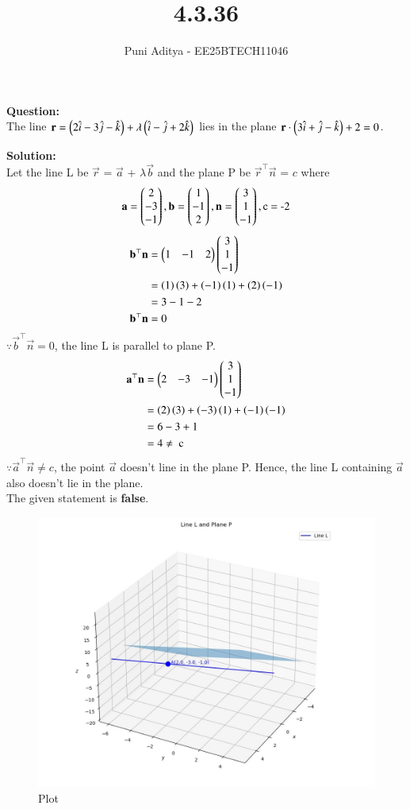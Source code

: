 \documentclass[journal]{IEEEtran}
\begin{document}
\title{4.3.36}
\author{Puni Aditya - EE25BTECH11046}
\maketitle
\textbf{Question:}\\
The line $\mathbf{r} = \left(2\hat{i} - 3\hat{j} - \hat{k}\right) + \lambda\left(\hat{i} - \hat{j} + 2\hat{k}\right)$ lies in the plane $\mathbf{r} \cdot \left(3\hat{i} + \hat{j} - \hat{k}\right) + 2 = 0$.

\textbf{Solution:}\\
Let the line L be $\vec{r}$ = $\vec{a}$ + $\lambda\vec{b}$ and the plane P be $\vec{r}^\top\vec{n}$ = $c$ where
\begin{align*}
    \mathbf{a} = \begin{pmatrix}2 \\ -3 \\ -1\end{pmatrix}, \mathbf{b} = \begin{pmatrix}1 \\ -1 \\ 2\end{pmatrix}, \mathbf{n} = \begin{pmatrix}3 \\ 1 \\ -1\end{pmatrix}, \text{c = -2}
\end{align*}
\begin{align}
    \mathbf{b}^\top\mathbf{n} &= \begin{pmatrix}1 & -1 & 2\end{pmatrix}\begin{pmatrix}3 \\ 1 \\ -1\end{pmatrix} \\
    &= \left(1\right)\left(3\right)+\left(-1\right)\left(1\right)+\left(2\right)\left(-1\right) \\
    &= 3-1-2 \\
    \mathbf{b}^\top\mathbf{n} &= 0
\end{align}
$\because \vec{b}^\top\vec{n} = 0$, the line L is parallel to plane P.
\begin{align}
    \mathbf{a}^\top\mathbf{n} &= \begin{pmatrix}2 & -3 & -1\end{pmatrix}\begin{pmatrix}3 \\ 1 \\ -1\end{pmatrix} \\
    &= \left(2\right)\left(3\right) + \left(-3\right)\left(1\right) + \left(-1\right)\left(-1\right) \\
    &= 6-3+1 \\
    &= 4 \neq \text{ c}
\end{align}
$\because \vec{a}^\top\vec{n} \neq c$, the point $\vec{a}$ doesn't line in the plane P. Hence, the line L containing $\vec{a}$ also doesn't lie in the plane. \\
The given statement is \textbf{false}.

\begin{figure}
    \centering
    \includegraphics[width=\columnwidth]{figs/plot_c.jpg}
    \caption*{Plot}
    \label{fig:fig}
\end{figure}
\end{document}
